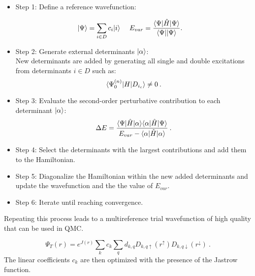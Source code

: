 \begin{itemize}
\item Step 1: Define a reference wavefunction:

    \begin{equation}
     \begin{gathered}
       \begin{aligned}
         \lvert \Psi \rangle&=\sum_{i\in D} c_i\lvert i \rangle \,         \,
         &E_{var}&= \frac{\langle \Psi \rvert\hat{H}\lvert \Psi \rangle}{\langle \Psi \rvert\lvert \Psi \rangle}. 
       \end{aligned} 
     \end{gathered}
   \end{equation}
   
 \item Step 2: Generate external determinants $\lvert \alpha \rangle$:\\
New determinants are added by generating all single and double excitations from determinants $i \in D$ such as:\\ 
\begin{equation}
\langle \Psi_0^{(n)} \rvert H\lvert D_{i_c} \rangle\neq 0\:.
\end{equation}

\item Step 3: Evaluate the second-order perturbative contribution to each determinant $\lvert \alpha \rangle$:
\begin{equation}
\Delta E=\frac{\langle \Psi \rvert\hat{H}\lvert \alpha \rangle\langle \alpha \rvert\hat{H}\lvert \Psi \rangle}{E_{var}-\langle \alpha \rvert\hat{H}\lvert \alpha \rangle}\:.
\end{equation}

\item Step 4: Select the determinants with the largest contributions and add them to the Hamiltonian.
\item Step 5: Diagonalize the Hamiltonian within the new added determinants and update the wavefunction and the the value of $E_{var}$.
\item Step 6: Iterate until reaching convergence.
\end{itemize}

Repeating this process leads to a multireference trial wavefunction of high quality that can be used in QMC. 

\begin{equation}
\Psi_T(r)=e^{J(r)}\sum_k c_k \sum_q d_{k,q}D_{k,q\uparrow } (r^{\uparrow})D_{k,q\downarrow}(r^{\downarrow})\:.
\end{equation}
The linear coefficients $c_k$ are then optimized with the presence of the Jastrow function. 

